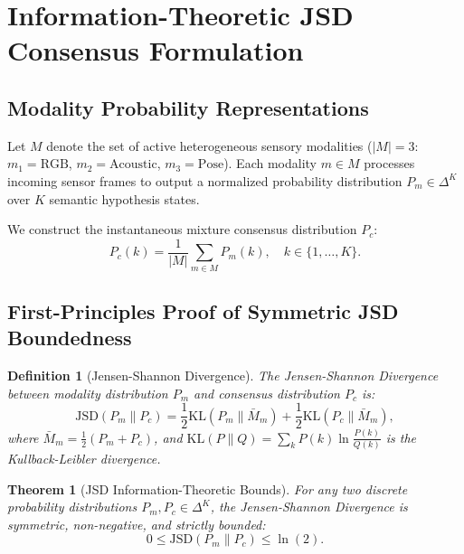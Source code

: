 \documentclass[conference]{IEEEtran}
\newtheorem{theorem}{Theorem}
\newtheorem{definition}{Definition}
\begin{document}
\section{Information-Theoretic JSD Consensus Formulation}
\subsection{Modality Probability Representations}
Let $M$ denote the set of active heterogeneous sensory modalities ($|M|=3$: $m_1 = \text{RGB}$, $m_2 = \text{Acoustic}$, $m_3 = \text{Pose}$). Each modality $m \in M$ processes incoming sensor frames to output a normalized probability distribution $P_m \in \Delta^K$ over $K$ semantic hypothesis states.

We construct the instantaneous mixture consensus distribution $P_c$:
\begin{equation}
P_c(k) = \frac{1}{|M|} \sum_{m \in M} P_m(k), \quad k \in \{1, \dots, K\}.
\end{equation}

\subsection{First-Principles Proof of Symmetric JSD Boundedness}
\begin{definition}[Jensen-Shannon Divergence]
The Jensen-Shannon Divergence between modality distribution $P_m$ and consensus distribution $P_c$ is:
\begin{equation}
\mathrm{JSD}(P_m \parallel P_c) = \frac{1}{2} \mathrm{KL}(P_m \parallel \bar{M}_m) + \frac{1}{2} \mathrm{KL}(P_c \parallel \bar{M}_m),
\end{equation}
where $\bar{M}_m = \frac{1}{2}(P_m + P_c)$, and $\mathrm{KL}(P \parallel Q) = \sum_k P(k) \ln \frac{P(k)}{Q(k)}$ is the Kullback-Leibler divergence.
\end{definition}

\begin{theorem}[JSD Information-Theoretic Bounds]
For any two discrete probability distributions $P_m, P_c \in \Delta^K$, the Jensen-Shannon Divergence is symmetric, non-negative, and strictly bounded:
\begin{equation}
0 \le \mathrm{JSD}(P_m \parallel P_c) \le \ln(2).
\end{equation}
\end{theorem}
\end{document}
